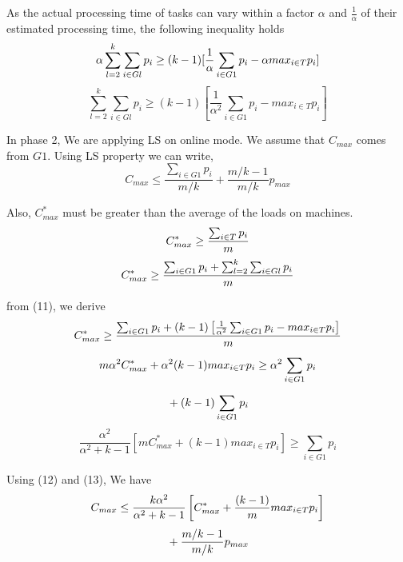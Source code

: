 \documentclass[10pt, conference, compsocconf]{IEEEtran}
\begin{document}
As the actual processing time of tasks  can vary within a factor $\alpha$ and $\frac{1}{\alpha}$ of their estimated processing time, the following inequality holds
\begin{equation}{\nonumber}
 \alpha\sum_{l=2}^{k}\sum_{i \in Gl }^{}{{p_{i}}} \geq (k-1)[\frac{1}{\alpha}\sum_{i \in G1 }^{}{{p_{i}}}- \alpha {max_{i \in T}}{{p_{i}}}]
\end{equation}
\begin{equation}
\sum_{l=2}^{k}\sum_{i \in Gl }^{}{{p_{i}}} \geq (k-1)[\frac{1}{\alpha^{2}}\sum_{i \in G1 }^{}{{p_{i}}}-  {max_{i \in T}}{{p_{i}}}]
\end{equation}

In phase 2, We are applying LS on online mode. We assume that $C_{max}$ comes from $G1$. Using LS property we can write,
\begin{equation}
 C_{max} \leq \frac{\sum_{i \in G1 }^{}{{p_{i}}}}{m/k} + {\frac{m/k-1}{m/k}} p_{max} 
\end{equation}

Also, $C_{max}^{*}$ must be greater than the average of the  loads on  machines.
\begin{equation}{\nonumber}
C_{max}^{*} \geq  \frac{\sum_{i \in T }^{}{{p_{i}}}}{m}
\end{equation}
\begin{equation}
{\nonumber} C_{max}^{*} \geq  \frac{\sum_{i \in G1 }^{}{{p_{i}}}+ \sum_{l=2}^{k}\sum_{i \in Gl }^{}{{p_{i}}}}{m}
\end{equation}

from (11), we derive
\begin{equation}{\nonumber}
 C_{max}^{*} \geq  \frac{\sum_{i \in G1 }^{}{{p_{i}}}+ (k-1)\left[\frac{1}{\alpha^{2}}\sum_{i \in G1 }^{}{{p_{i}}}-  {max_{i \in T}}{{p_{i}}}\right]}{m}
\end{equation}
\begin{equation}{\nonumber}
 m\alpha^{2}C_{max}^{*} + \alpha^{2} (k-1){max_{i \in T}}{{p_{i}}} \geq  \alpha^{2}\sum_{i \in G1 }^{}{{p_{i}}}  
\end{equation}
\begin{equation}{\nonumber}
 + (k-1)\sum_{i \in G1 }^{}{{p_{i}}} 
\end{equation}
\begin{equation}
\frac{\alpha^{2}}{\alpha^{2}+k-1}\left[m C_{max}^{*}+(k-1) {max_{i \in T}}{{p_{i}}}\right] \geq \sum_{i \in G1 }^{}{{p_{i}}}  
\end{equation}

Using (12) and (13), We have
\begin{equation}{\nonumber}
C_{max} \leq \frac{k\alpha^{2}}{\alpha^{2}+k-1}\left[ C_{max}^{*}+\frac{(k-1)}{m} {max_{i \in T}}{{p_{i}}}\right]
\end{equation}
\begin{equation}{\nonumber}
 + {\frac{m/k-1}{m/k}} p_{max} 
\end{equation}
\end{document}
